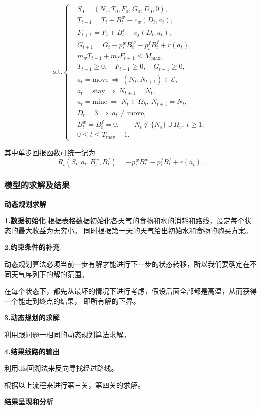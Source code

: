 \[
\mathrm{s.t.}\left\{
\begin{aligned}
&S_0=(N_s,T_0,F_0,G_0,D_0,0),\\[1mm]
&T_{t+1}=T_t+B_t^w-c_w(D_t,a_t),\\[1mm]
&F_{t+1}=F_t+B_t^f-c_f(D_t,a_t),\\[1mm]
&G_{t+1}=G_t-p_t^wB_t^w-p_t^fB_t^f+r(a_t),\\[1mm]
&m_wT_{t+1}+m_fF_{t+1}\le M_{\max},\\[1mm]
&T_{t+1}\ge 0,\quad F_{t+1}\ge 0,\quad G_{t+1}\ge 0,\\[1mm]
&a_t=\text{move}\ \Rightarrow\ (N_t,N_{t+1})\in\mathcal{E},\\[1mm]
&a_t=\text{stay}\ \Rightarrow\ N_{t+1}=N_t,\\[1mm]
&a_t=\text{mine}\ \Rightarrow\ N_t\in\Omega_h,\ N_{t+1}=N_t,\\[1mm]
&D_t=3\ \Rightarrow\ a_t\neq \text{move},\\[1mm]
&B_t^w=B_t^f=0,\qquad N_t\notin \{N_s\}\cup\Omega_v,\ t\ge 1,\\[1mm]
&0\le t\le T_{\max}-1.
\end{aligned}
\right.
\label{eq:q2_cons}
\]

其中单步回报函数可统一记为
\[
R_t(S_t,a_t,B_t^w,B_t^f)
=
-p_t^wB_t^w-p_t^fB_t^f+r(a_t).
\]

\subsubsection{模型的求解及结果}

\textbf{动态规划求解} 

\textbf{1.数据初始化}
根据表格数据初始化各天气的食物和水的消耗和路线，设定每个状态的最大收益为无穷小。
%
同时根据第一天的天气给出初始水和食物的购买方案。

\textbf{2.约束条件的补充}

动态规划算法必须当前一步有解才能进行下一步的状态转移，所以我们要确定在不同天气序列下的解的范围。

在每个状态下，都先从最坏的情况下进行考虑，假设后面全部都是高温，从而获得一个能走到终点的结果，
%
即所有解的下界。

\textbf{3.动态规划的求解}

利用跟问题一相同的动态规划算法求解。

\textbf{4.结果线路的输出}

利用dfs回溯法来反向寻找经过路线。

根据以上流程来进行第三关，第四关的求解。

\textbf{结果呈现和分析}

